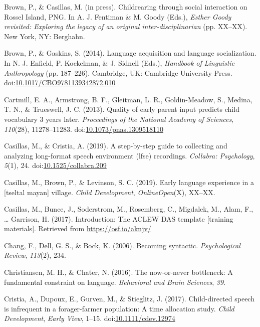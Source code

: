 \documentclass[,man,floatsintext]{apa6}
\begin{document}
\hypertarget{ref-brownIPchildrearing}{}
Brown, P., \& Casillas, M. (in press). Childrearing through social
interaction on Rossel Island, PNG. In A. J. Fentiman \& M. Goody (Eds.),
\emph{Esther Goody revisited: Exploring the legacy of an original
inter-disciplinarian} (pp. XX--XX). New York, NY: Berghahn.

\hypertarget{ref-brown2014language}{}
Brown, P., \& Gaskins, S. (2014). Language acquisition and language
socialization. In N. J. Enfield, P. Kockelman, \& J. Sidnell (Eds.),
\emph{Handbook of Linguistic Anthropology} (pp. 187--226). Cambridge,
UK: Cambridge University Press.
doi:\href{https://doi.org/10.1017/CBO9781139342872.010}{10.1017/CBO9781139342872.010}

\hypertarget{ref-cartmill2013quality}{}
Cartmill, E. A., Armstrong, B. F., Gleitman, L. R., Goldin-Meadow, S.,
Medina, T. N., \& Trueswell, J. C. (2013). Quality of early parent input
predicts child vocabulary 3 years later. \emph{Proceedings of the
National Academy of Sciences}, \emph{110}(28), 11278--11283.
doi:\href{https://doi.org/10.1073/pnas.1309518110}{10.1073/pnas.1309518110}

\hypertarget{ref-casillas2019stepbystep}{}
Casillas, M., \& Cristia, A. (2019). A step-by-step guide to collecting
and analyzing long-format speech environment (lfse) recordings.
\emph{Collabra: Psychology}, \emph{5}(1), 24.
doi:\href{https://doi.org/10.1525/collabra.209}{10.1525/collabra.209}

\hypertarget{ref-casillas2019early}{}
Casillas, M., Brown, P., \& Levinson, S. C. (2019). Early language
experience in a {[}tseltal mayan{]} village. \emph{Child Development},
\emph{OnlineOpen}(X), XX--XX.

\hypertarget{ref-casillas2017ACLEWDAS}{}
Casillas, M., Bunce, J., Soderstrom, M., Rosemberg, C., Migdalek, M.,
Alam, F., \ldots{} Garrison, H. (2017). Introduction: The ACLEW DAS
template {[}training materials{]}. Retrieved from
\url{https://osf.io/aknjv/}

\hypertarget{ref-chang2006becoming}{}
Chang, F., Dell, G. S., \& Bock, K. (2006). Becoming syntactic.
\emph{Psychological Review}, \emph{113}(2), 234.

\hypertarget{ref-christiansen2016now}{}
Christiansen, M. H., \& Chater, N. (2016). The now-or-never bottleneck:
A fundamental constraint on language. \emph{Behavioral and Brain
Sciences}, \emph{39}.

\hypertarget{ref-cristia2017child}{}
Cristia, A., Dupoux, E., Gurven, M., \& Stieglitz, J. (2017).
Child-directed speech is infrequent in a forager-farmer population: A
time allocation study. \emph{Child Development}, \emph{Early View},
1--15. doi:\href{https://doi.org/10.1111/cdev.12974}{10.1111/cdev.12974}
\end{document}
